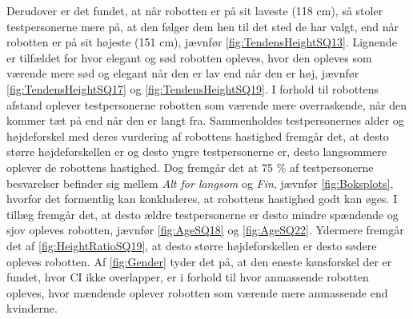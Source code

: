 Derudover er det fundet, at når robotten er på sit laveste (118 cm), så stoler testpersonerne mere på, at den følger dem hen til det sted de har valgt, end når robotten er på sit højeste (151 cm), jævnfør \autoref{fig:TendensHeightSQ13}. Lignende er tilfældet for hvor elegant og sød robotten opleves, hvor den opleves som værende mere sød og elegant når den er lav end når den er høj, jævnfør \autoref{fig:TendensHeightSQ17} og \autoref{fig:TendensHeightSQ19}. I forhold til robottens afstand oplever testpersonerne robotten som værende mere overraskende, når den kommer tæt på end når den er langt fra. Sammenholdes testpersonernes alder og højdeforskel med deres vurdering af robottens hastighed fremgår det, at desto større højdeforskellen er og desto yngre testpersonerne er, desto langsommere oplever de robottens hastighed. Dog fremgår det at 75 \% af testpersonerne besvarelser befinder sig mellem \textit{Alt for langsom} og \textit{Fin}, jævnfør \autoref{fig:Boksplots}, hvorfor det formentlig kan konkluderes, at robottens hastighed godt kan øges. I tillæg fremgår det, at desto ældre testpersonerne er desto mindre spændende og sjov opleves robotten, jævnfør \autoref{fig:AgeSQ18} og \autoref{fig:AgeSQ22}. Ydermere fremgår det af \autoref{fig:HeightRatioSQ19}, at desto større højdeforskellen er desto sødere opleves robotten. Af \autoref{fig:Gender} tyder det på, at den eneste kønsforskel der er fundet, hvor CI ikke overlapper, er i forhold til hvor anmassende robotten opleves, hvor mændende oplever robotten som værende mere anmassende end kvinderne.
